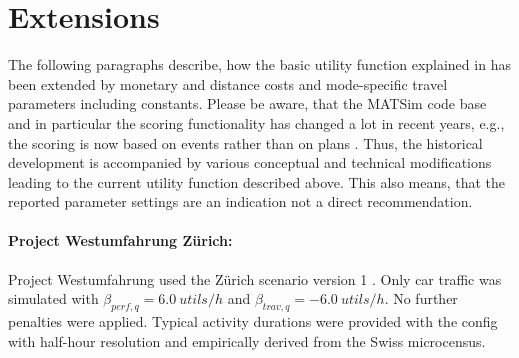 %

\section{Extensions}
\label{sec:utfextensions}
The following paragraphs describe, how the basic utility function explained in \citet[][]{CharyparNagel_Transportation_2005} has been extended by monetary and distance costs and mode-specific travel parameters including constants. Please be aware, that the MATSim code base and in particular the scoring functionality has changed a lot in recent years, e.g., the scoring is now based on events rather than on plans . Thus, the historical development is accompanied by various conceptual and technical modifications leading to the current utility function described above. This also means, that the reported parameter settings are an indication not a direct recommendation.

\paragraph{Project Westumfahrung Zürich:}
Project Westumfahrung \citep[][]{BalmerEtAl_ResRep_bdktzrh_2009} used the Zürich scenario version 1 \citep[][]{HorniEtAl_TechRep_IVT_2011_a}. Only car traffic was simulated with $\beta_{perf,q}=6.0\ utils/h$ and $\beta_{trav,q}=-6.0\  utils/h$. No further penalties were applied. Typical activity durations were provided with the config with half-hour resolution and empirically derived from the Swiss microcensus.

